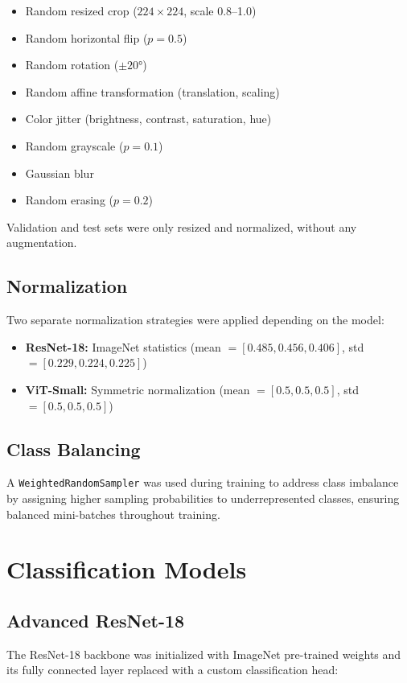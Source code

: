 \documentclass[12pt]{report}
\begin{document}
\begin{itemize}
    \item Random resized crop ($224 \times 224$, scale 0.8--1.0)
    \item Random horizontal flip ($p = 0.5$)
    \item Random rotation ($\pm 20°$)
    \item Random affine transformation (translation, scaling)
    \item Color jitter (brightness, contrast, saturation, hue)
    \item Random grayscale ($p = 0.1$)
    \item Gaussian blur
    \item Random erasing ($p = 0.2$)
\end{itemize}

Validation and test sets were only resized and normalized, without
any augmentation.

\subsection{Normalization}
Two separate normalization strategies were applied depending on the model:

\begin{itemize}
    \item \textbf{ResNet-18:} ImageNet statistics
    (mean $= [0.485, 0.456, 0.406]$, std $= [0.229, 0.224, 0.225]$)
    \item \textbf{ViT-Small:} Symmetric normalization
    (mean $= [0.5, 0.5, 0.5]$, std $= [0.5, 0.5, 0.5]$)
\end{itemize}

\subsection{Class Balancing}
A \texttt{WeightedRandomSampler} was used during training to address
class imbalance by assigning higher sampling probabilities to
underrepresented classes, ensuring balanced mini-batches throughout
training.

\section{Classification Models}

\subsection{Advanced ResNet-18}
The ResNet-18 backbone was initialized with ImageNet pre-trained weights
and its fully connected layer replaced with a custom classification head:
\end{document}
